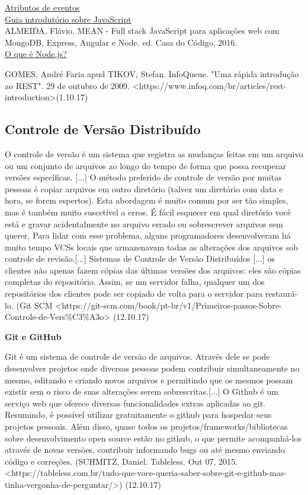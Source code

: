 \documentclass[
	12pt,				%
	oneside,			%
	a4paper,			%
	brazil				%
]{abntex2}
\begin{document}
{%
\href{https://www.w3schools.com/tags/ref_eventattributes.asp}{Atributos de eventos}\\
\href{http://tableless.github.io/iniciantes/manual/js/}{Guia introdutório sobre JavaScript}\\

ALMEIDA, Flávio. MEAN - Full stack JavaScript para aplicações web com MongoDB, Express, Angular e Node. ed. Casa do Código, 2016.\\
\href{http://nodebr.com/o-que-e-node-js/}{O que é Node.js?} %

GOMES, André Faria apud TIKOV, Stefan. InfoQueue. "Uma rápida introdução ao REST". 29 de outubro de 2009. <https://www.infoq.com/br/articles/rest-introduction>(1.10.17)

\subsection{Controle de Versão Distribuído}

O controle de versão é um sistema que registra as mudanças feitas em um arquivo ou um conjunto de arquivos ao longo do tempo de forma que possa recuperar versões específicas. [...]
O método preferido de controle de versão por muitas pessoas é copiar arquivos em outro diretório (talvez um diretório com data e hora, se forem espertos). Esta abordagem é muito comum por ser tão simples, mas é também muito suscetível a erros. É fácil esquecer em qual diretório você está e gravar acidentalmente no arquivo errado ou sobrescrever arquivos sem querer. Para lidar com esse problema, alguns programadores desenvolveram há muito tempo VCSs locais que armazenavam todas as alterações dos arquivos sob controle de revisão.[...]
Sistemas de Controle de Versão Distribuídos [...] os clientes não apenas fazem cópias das últimas versões dos arquivos: eles são cópias completas do repositório. Assim, se um servidor falha, qualquer um dos repositórios dos clientes pode ser copiado de volta para o servidor para restaurá-lo. (Git SCM <https://git-scm.com/book/pt-br/v1/Primeiros-passos-Sobre-Controle-de-Vers\%C3\%A3o> (12.10.17)

\textbf{Git e GitHub}

Git é um sistema de controle de versão de arquivos. Através dele se pode desenvolver projetos onde diversas pessoas podem contribuir simultaneamente no mesmo, editando e criando novos arquivos e permitindo que os mesmos possam existir sem o risco de suas alterações serem sobrescritas.[...]
O Github é um serviço web que oferece diversas funcionalidades extras aplicadas ao git. Resumindo, é possível utilizar gratuitamente o github para hospedar seus projetos pessoais. Além disso, quase todos os projetos/frameworks/bibliotecas sobre desenvolvimento open source estão no github, o que permite acompanhá-los através de novas versões, contribuir informando bugs ou até mesmo enviando código e correções. (SCHMITZ, Daniel. Tableless. Out 07, 2015. <https://tableless.com.br/tudo-que-voce-queria-saber-sobre-git-e-github-mas-tinha-vergonha-de-perguntar/>) (12.10.17)

}
\end{document}
